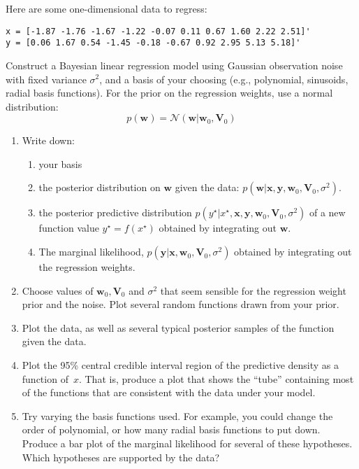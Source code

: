\documentclass[submit]{harvardml}
\newcommand{\bx}{\mathbf{x}}
\newcommand{\by}{\mathbf{y}}
\newcommand{\bw}{\mathbf{w}}
\newcommand{\distNorm}{\mathcal{N}}
\begin{document}
\begin{problem}
Here are some one-dimensional data to regress:
\begin{verbatim}
x = [-1.87 -1.76 -1.67 -1.22 -0.07 0.11 0.67 1.60 2.22 2.51]'
y = [0.06 1.67 0.54 -1.45 -0.18 -0.67 0.92 2.95 5.13 5.18]'
\end{verbatim}
Construct a Bayesian linear regression model using Gaussian observation noise with fixed variance $\sigma^2$, and a basis of your choosing (e.g., polynomial, sinusoids, radial basis functions).
For the prior on the regression weights, use a normal distribution:
$$p(\bw) = \distNorm(\bw | \bw_0, \mathbf V_0)$$


\begin{enumerate}
  \item Write down:
  \begin{enumerate}
    \item your basis
    \item the posterior distribution on $\bw$ given the data: $p(\bw | \bx, \by, \bw_0, \mathbf V_0, \sigma^2)$.
    \item the posterior predictive distribution $p(y^\star | x^\star, \bx, \by, \bw_0, \mathbf V_0, \sigma^2)$ of a new function value $y^\star = f(x^\star)$ obtained by integrating out $\bw$.
  \item The marginal likelihood, $p(\by | \bx, \bw_0,\boldsymbol V_0, \sigma^2)$ obtained by integrating out the regression weights.
  \end{enumerate}
  \item Choose values of $\bw_0, \mathbf V_0$ and $\sigma^2$ that seem sensible for the regression weight prior and the noise.
  Plot several random functions drawn from your prior.

  \item Plot the data, as well as several typical posterior samples of the function given the data.

  \item Plot the 95\% central credible interval region of the
    predictive density as a function of~$x$. That is, produce a plot
    that shows the ``tube'' containing most of the functions that are
    consistent with the data under your model.

  \item Try varying the basis functions used.  For example, you could change the
    order of polynomial, or how many radial basis functions to put
    down.  Produce a bar plot of the marginal likelihood for several of these hypotheses.
    Which hypotheses are supported by the data?
  \end{enumerate}
\end{problem}
\end{document}
